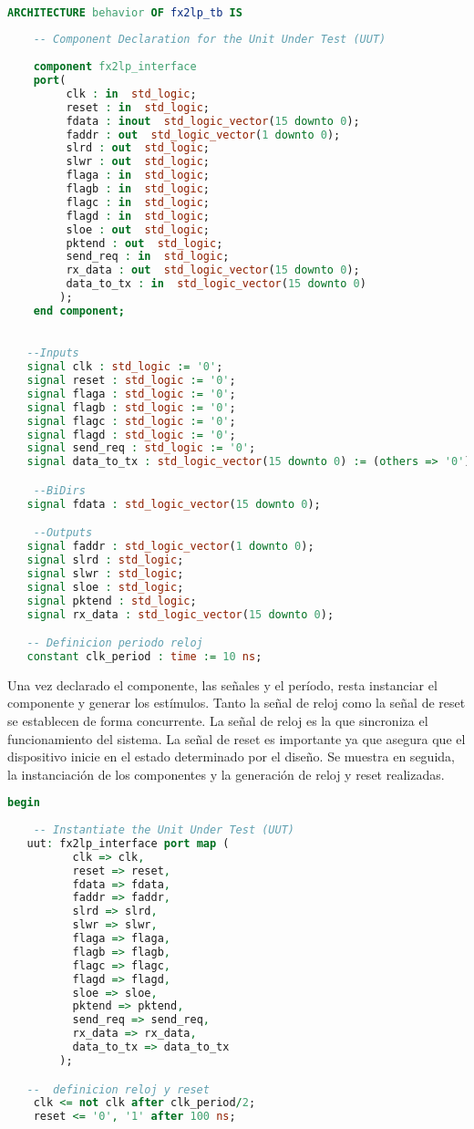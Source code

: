 \begin{lstlisting}[language=VHDL,backgroundcolor=\color{gray!30}]

ARCHITECTURE behavior OF fx2lp_tb IS 
 
    -- Component Declaration for the Unit Under Test (UUT)
 
    component fx2lp_interface
    port(
         clk : in  std_logic;
         reset : in  std_logic;
         fdata : inout  std_logic_vector(15 downto 0);
         faddr : out  std_logic_vector(1 downto 0);
         slrd : out  std_logic;
         slwr : out  std_logic;
         flaga : in  std_logic;
         flagb : in  std_logic;
         flagc : in  std_logic;
         flagd : in  std_logic;
         sloe : out  std_logic;
         pktend : out  std_logic;
         send_req : in  std_logic;
         rx_data : out  std_logic_vector(15 downto 0);
         data_to_tx : in  std_logic_vector(15 downto 0)
        );
    end component;
    

   --Inputs
   signal clk : std_logic := '0';
   signal reset : std_logic := '0';
   signal flaga : std_logic := '0';
   signal flagb : std_logic := '0';
   signal flagc : std_logic := '0';
   signal flagd : std_logic := '0';
   signal send_req : std_logic := '0';
   signal data_to_tx : std_logic_vector(15 downto 0) := (others => '0');

	--BiDirs
   signal fdata : std_logic_vector(15 downto 0);

 	--Outputs
   signal faddr : std_logic_vector(1 downto 0);
   signal slrd : std_logic;
   signal slwr : std_logic;
   signal sloe : std_logic;
   signal pktend : std_logic;
   signal rx_data : std_logic_vector(15 downto 0);

   -- Definicion periodo reloj
   constant clk_period : time := 10 ns;
 \end{lstlisting}
 
Una vez declarado el componente, las señales y el período, resta instanciar el componente y generar los estímulos. Tanto la señal de reloj como la señal de reset se establecen de forma concurrente. La señal de reloj es la que sincroniza el funcionamiento del sistema. La señal de reset es importante ya que asegura que el dispositivo inicie en el estado determinado por el diseño. Se muestra en seguida, la instanciación de los componentes y la generación de reloj y reset realizadas.

\begin{lstlisting}[language=VHDL,backgroundcolor=\color{gray!30}]
begin
 
	-- Instantiate the Unit Under Test (UUT)
   uut: fx2lp_interface port map (
          clk => clk,
          reset => reset,
          fdata => fdata,
          faddr => faddr,
          slrd => slrd,
          slwr => slwr,
          flaga => flaga,
          flagb => flagb,
          flagc => flagc,
          flagd => flagd,
          sloe => sloe,
          pktend => pktend,
          send_req => send_req,
          rx_data => rx_data,
          data_to_tx => data_to_tx
        );

   --  definicion reloj y reset
	clk <= not clk after clk_period/2;
	reset <= '0', '1' after 100 ns;

\end{lstlisting}

